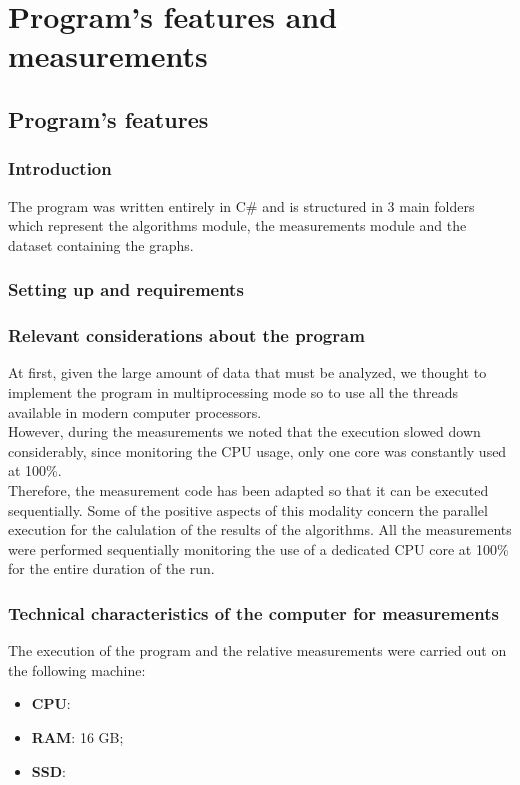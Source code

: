 \section{Program's features and measurements}

\subsection{Program's features}

\subsubsection{Introduction}
The program was written entirely in C\# and is structured in 3 main folders which represent the algorithms module, the measurements module and the dataset containing the graphs.

\subsubsection{Setting up and requirements}

\subsubsection{Relevant considerations about the program}
At first, given the large amount of data that must be analyzed, we thought to implement the program in multiprocessing mode so to use all the threads available in modern computer processors. \\
\noindent
However, during the measurements we noted that the execution slowed down considerably, since monitoring the CPU usage, only one core was constantly used at 100\%. \\ 
\noindent
Therefore, the measurement code has been adapted so that it can be executed sequentially. Some of the positive aspects of this modality concern the parallel execution for the calulation of the results of the algorithms.
\noindent
All the measurements were performed sequentially monitoring the use of a dedicated CPU core at 100\% for the entire duration of the run.

\subsubsection{Technical characteristics of the computer for measurements}
The execution of the program and the relative measurements were carried out on the following machine:
\begin{itemize}
    \item \textbf{CPU}: 
    \item \textbf{RAM}: 16 GB;
    \item \textbf{SSD}:
\end{itemize}

